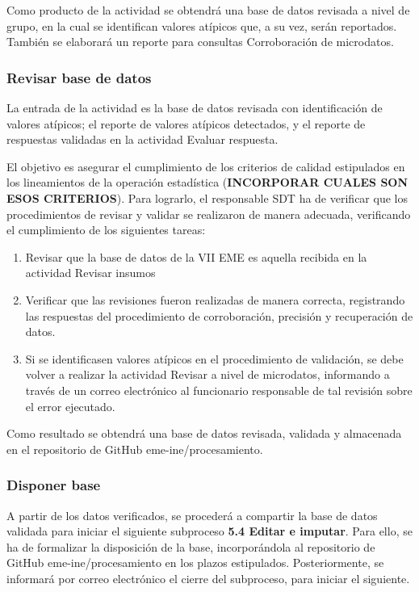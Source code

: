 \documentclass[
]{article}
\providecommand{\tightlist}{%
  \setlength{\itemsep}{0pt}\setlength{\parskip}{0pt}}
\begin{document}
Como producto de la actividad se obtendrá una base de datos revisada a nivel de grupo, en la cual se identifican valores atípicos que, a su vez, serán reportados. También se elaborará un reporte para consultas Corroboración de microdatos.

\hypertarget{revisar-base-de-datos-2}{%
\subsubsection{Revisar base de datos}\label{revisar-base-de-datos-2}}

La entrada de la actividad es la base de datos revisada con identificación de valores atípicos; el reporte de valores atípicos detectados, y el reporte de respuestas validadas en la actividad Evaluar respuesta.

El objetivo es asegurar el cumplimiento de los criterios de calidad estipulados en los lineamientos de la operación estadística (\textbf{INCORPORAR CUALES SON ESOS CRITERIOS}). Para lograrlo, el responsable SDT ha de verificar que los procedimientos de revisar y validar se realizaron de manera adecuada, verificando el cumplimiento de los siguientes tareas:

\begin{enumerate}
\def\labelenumi{\alph{enumi})}
\tightlist
\item
  Revisar que la base de datos de la VII EME es aquella recibida en la actividad Revisar insumos
\item
  Verificar que las revisiones fueron realizadas de manera correcta, registrando las respuestas del procedimiento de corroboración, precisión y recuperación de datos.
\item
  Si se identificasen valores atípicos en el procedimiento de validación, se debe volver a realizar la actividad Revisar a nivel de microdatos, informando a través de un correo electrónico al funcionario responsable de tal revisión sobre el error ejecutado.
\end{enumerate}

Como resultado se obtendrá una base de datos revisada, validada y almacenada en el repositorio de GitHub eme-ine/procesamiento.

\hypertarget{disponer-base-1}{%
\subsubsection{Disponer base}\label{disponer-base-1}}

A partir de los datos verificados, se procederá a compartir la base de datos validada para iniciar el siguiente subproceso \textbf{5.4 Editar e imputar}. Para ello, se ha de formalizar la disposición de la base, incorporándola al repositorio de GitHub eme-ine/procesamiento en los plazos estipulados. Posteriormente, se informará por correo electrónico el cierre del subproceso, para iniciar el siguiente.
\end{document}
